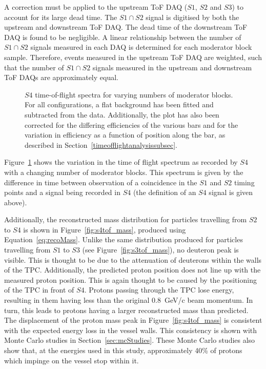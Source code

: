 A correction must be applied to the upstream ToF DAQ ($\mathit{S1}$, $\mathit{S2}$ and $\mathit{S3}$) to account for its large dead time.
The $\mathit{S1} \cap \mathit{S2}$ signal is digitised by both the upstream and downstream ToF DAQ.
The dead time of the downstream ToF DAQ is found to be negligible.
A linear relationship between the number of $\mathit{S1} \cap \mathit{S2}$ signals measured in each DAQ is determined for each moderator block sample.
Therefore, events measured in the upstream ToF DAQ are weighted, such that the number of $\mathit{S1} \cap \mathit{S2}$ signals measured in the upstream and downstream ToF DAQs are approximately equal.

\begin{figure}[h]
  \begin{adjustbox}{max totalsize={.9\textwidth}{.5\textheight},center}
    
  \end{adjustbox}
  \caption{$\mathit{S4}$ time-of-flight spectra for varying numbers of moderator blocks. For all configurations, a flat background has been fitted and subtracted from the data. Additionally, the plot has also been corrected for the differing efficiencies of the various bars and for the variation in efficiency as a function of position along the bar, as described in Section~\ref{timeofflightanalysissubsec}.}
  \label{fig:s4tof}	
\end{figure}

Figure~\ref{fig:s4tof} shows the variation in the time of flight spectrum as recorded by $\mathit{S4}$ with a changing number of moderator blocks.
This spectrum is given by the difference in time between observation of a coincidence in the $\mathit{S1}$ and $\mathit{S2}$ timing points and a signal being recorded in $\mathit{S4}$ (the definition of an $\mathit{S4}$ signal is given above).

Additionally, the reconstructed mass distribution for particles travelling from $\mathit{S2}$ to $\mathit{S4}$ is shown in Figure~\ref{fig:s4tof_mass}, produced using Equation~\ref{eq:recoMass}.
Unlike the same distribution produced for particles travelling from $\mathit{S1}$ to $\mathit{S3}$ (see Figure~\ref{fig:s3tof_mass}), no deuteron peak is visible.
This is thought to be due to the attenuation of deuterons within the walls of the TPC.
Additionally, the predicted proton position does not line up with the measured proton position. 
This is again thought to be caused by the positioning of the TPC in front of $\mathit{S4}$.
Protons passing through the TPC lose energy, resulting in them having less than the original 0.8~GeV/c beam momentum.
In turn, this leads to protons having a larger reconstructed mass than predicted.
The displacement of the proton mass peak in Figure~\ref{fig:s4tof_mass} is consistent with the expected energy loss in the vessel walls.
This consistency is shown with Monte Carlo studies in Section~\ref{sec:mcStudies}.
These Monte Carlo studies also show that, at the energies used in this study, approximately 40\% of protons which impinge on the vessel stop within it.

